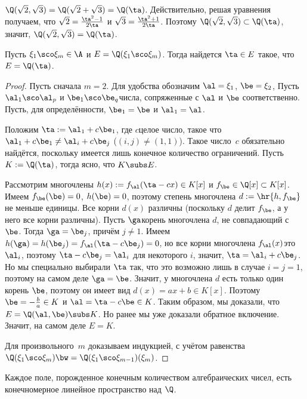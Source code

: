 \documentclass[a4paper]{article}
\begin{document}
\begin{ex}
$\Q(\sqrt{2},\sqrt{3})=\Q(\sqrt{2}+\sqrt{3})=\Q(\ta)$. Действительно, решая
уравнения
получаем, что
$\sqrt{2}=\frac{\ta^2-1}{2\ta}$ и $\sqrt{3}=\frac{\ta^2+1}{2\ta}$. Поэтому
$\Q(\sqrt{2},\sqrt{3})\subset\Q(\ta)$, значит,
$\Q(\sqrt{2},\sqrt{3})=\Q(\ta)$.
\end{ex}

\begin{theorem}
Пусть $\xi_1\sco \xi_m \in \A$ и $E=\Q(\xi_1\sco \xi_m)$. Тогда найдется
$\ta\in E$ такое, что $E=\Q(\ta)$.
\end{theorem}
\begin{proof}
Пусть сначала $m=2$. Для удобства обозначим $\al=\xi_1$, $\be=\xi_2$, Пусть $\al_1\sco \al_p$ и
$\be_1\sco \be_q$\т числа, сопряженные с $\al$ и $\be$ соответственно.
Пусть, для определённости, $\be_1 = \be$ и $\al_1 = \al$.

Положим
$\ta:=\al_1+c\be_1$, где $c$\т  целое число, такое что
$\al_1+c\be_1\neq\al_i+c\be_j$ ($(i,j)\neq(1,1)$). Такое число~$c$ обязательно найдётся,
поскольку имеется лишь конечное количество ограничений. Пусть $K:=\Q(\ta)$, тогда ясно, что $K \subs E$.

Рассмотрим многочлены $h(x):=f_\al(\ta-cx)\in K[x]$ и $f_\be \in\Q[x]\subset K[x]$.
Имеем $f_\be(\be)=0$, $h(\be)=0$, поэтому степень многочлена $d:=\hr{h,f_\be}$ не меньше единицы.
Все корни $d(x)$ различны (поскольку $d$ делит $f_\be$, а у него все корни различны). Пусть
$\ga$\т корень многочлена $d$, не совпадающий с $\be$. Тогда  $\ga=\be_j$, причём $j\neq1$.
Имеем $h(\ga) = h(\be_j)=f_\al(\ta-c\be_j)=0$, но все корни многочлена $f_\al(x)$\т это $\al_i$,
поэтому $\ta-c\be_j=\al_i$ для некоторого $i$, значит, $\ta=\al_i+c\be_j$. Но мы специально выбирали $\ta$
так, что это возможно лишь в случае $i=j=1$, поэтому на самом деле $\ga=\be$.
Значит, у многочлена $d$ есть только один корень $\be$, поэтому он имеет вид $d(x)=ax+b\in K[x]$.
Поэтому $\be=-\frac ba\in K$ и $\al=\ta-c\be\in K$. Таким образом, мы доказали,
что $E=\Q(\al,\be)\subs K$.
Но ранее мы уже доказали обратное включение. Значит, на самом деле $E=K$.

Для произвольного~$m$ доказываем индукцией,
с учётом равенства $\Q(\xi_1\sco \xi_m) \bw= \Q(\xi_1\sco \xi_{m-1})(\xi_m)$.
\end{proof}

\begin{imp}
Каждое поле, порожденное конечным количеством алгебраических чисел, есть конечномерное линейное пространство
над $\Q$.
\end{imp}
\end{document}
